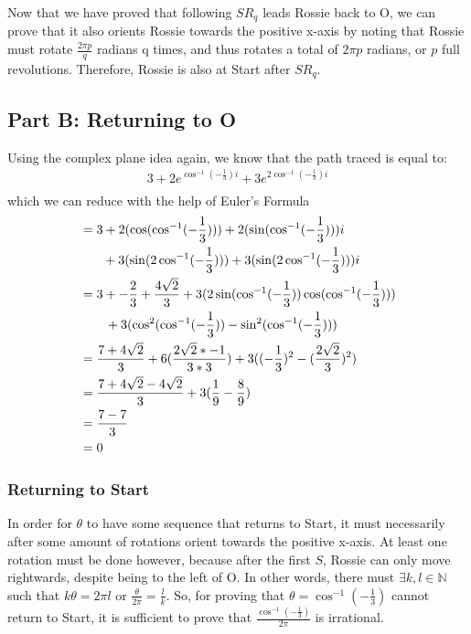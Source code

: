 \documentclass{article}
\begin{document}
  Now that we have proved that following $SR_q$ leads Rossie back to O, we can prove that it also orients Rossie towards the positive x-axis by noting that Rossie must rotate $\frac{2\pi p}{q}$ radians q times, and thus rotates a total of $2\pi p$ radians, or $p$ full revolutions. Therefore, Rossie is also at Start after $SR_q$.
  \subsection{Part B: Returning to O}
    Using the complex plane idea again, we know that the path traced is equal to:
  \begin{align}
    3 + 2e^{\cos^{-1}(-\frac{1}{3})i} + 3e^{2\cos^{-1}(-\frac{1}{3}) i}\\
  \end{align}
  which we can reduce with the help of Euler's Formula
  \begin{align}
    &= 3 + 2(\cos(\cos^{-1}(-\frac{1}{3}))) + 2(\sin(\cos^{-1}(-\frac{1}{3})))i \\  
    &\hspace{18px} + 3(\sin(2\cos^{-1}(-\frac{1}{3}))) + 3(\sin(2\cos^{-1}(-\frac{1}{3})))i \\
    &= 3 + -\frac{2}{3} + \frac{4\sqrt2}{3} + 3(2\sin(\cos^{-1}(-\frac{1}{3}))\cos(\cos^{-1}(-\frac{1}{3})))\\
    &\hspace{20px} + 3(\cos^2(\cos^{-1}(-\frac{1}{3})) - \sin^2(\cos^{-1}(-\frac{1}{3})))\\
    &= \frac{7 + 4\sqrt2}{3} + 6(\frac{2\sqrt2 * -1}{3*3}) + 3((-\frac{1}{3})^2 - (\frac{2\sqrt2}{3})^2)\\
    &= \frac{7 + 4\sqrt2 - 4\sqrt2}{3} + 3(\frac{1}{9} - \frac{8}{9})\\
    &= \frac{7 - 7}{3} \\
    &= 0
  \end{align}
  \subsubsection{Returning to Start}
  In order for $\theta$ to have some sequence that returns to Start, it must necessarily after some amount of rotations orient towards the positive x-axis. At least one rotation must be done however, because after the first $S$, Rossie can only move rightwards, despite being to the left of O. In other words, there must $\exists k, l \in \mathbb{N}$ such that $k\theta = 2\pi l$ or $\frac{\theta}{2\pi} = \frac{l}{k}$. So, for proving that $\theta = \cos^{-1}(-\frac{1}{3})$ cannot return to Start, it is sufficient to prove that $\frac{\cos^{-1}(-\frac{1}{3})}{2\pi}$ is irrational.
\end{document}
